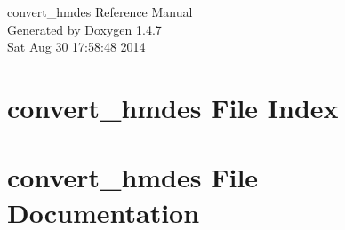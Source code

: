 \documentclass[letterpaper]{book}
\begin{document}
\begin{titlepage}
\vspace*{7cm}
\begin{center}
{\Large convert\_\-hmdes Reference Manual}\\
\vspace*{1cm}
{\large Generated by Doxygen 1.4.7}\\
\vspace*{0.5cm}
{\small Sat Aug 30 17:58:48 2014}\\
\end{center}
\end{titlepage}
\clearemptydoublepage
{}
\tableofcontents
\clearemptydoublepage
{}
\chapter{convert\_\-hmdes File Index}

\chapter{convert\_\-hmdes File Documentation}

\printindex
\end{document}
